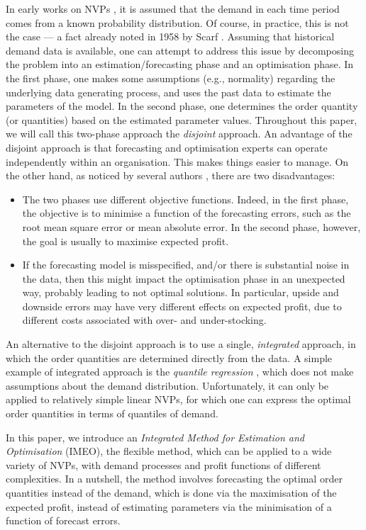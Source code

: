 \documentclass[a4paper,11pt]{article}
\begin{document}
In early works on NVPs \cite{AHM51,MK51}, it is assumed that the demand in each time period comes from a known probability distribution. Of course, in practice, this is not the case --- a fact already noted in 1958 by Scarf \cite{Sc58}. Assuming that historical demand data is available, one can attempt to address this issue by decomposing the problem into an estimation/forecasting phase and an optimisation phase. In the first phase, one makes some assumptions (e.g., normality) regarding the underlying data generating process, and uses the past data to estimate the parameters of the model. In the second phase, one determines the order quantity (or quantities) based on the estimated parameter values. Throughout this paper, we will call this two-phase approach the \emph{disjoint} approach. An advantage of the disjoint approach is that forecasting and optimisation experts can operate independently within an organisation. This makes things easier to manage. On the other hand, as noticed by several authors \cite{BT06,BM12,Ka94,KT96,KTB20}, there are two disadvantages:
\begin{itemize}
    \item The two phases use different objective functions. Indeed, in the first phase, the objective is to minimise a function of the forecasting errors, such as the root mean square error or mean absolute error. In the second phase, however, the goal is usually to maximise expected profit.
    \item If the forecasting model is misspecified, and/or there is substantial noise in the data, then this might impact the optimisation phase in an unexpected way, probably leading to not optimal solutions. In particular, upside and downside errors may have very different effects on expected profit, due to different costs associated with over- and under-stocking.
\end{itemize}

An alternative to the disjoint approach is to use a single, \emph{integrated} approach, in which the order quantities are determined directly from the data. A simple example of integrated approach is the \emph{quantile regression} \cite{Br16,Hu19}, which does not make assumptions about the demand distribution. Unfortunately, it can only be applied to relatively simple linear NVPs, for which one can express the optimal order quantities in terms of quantiles of demand.

In this paper, we introduce an \emph{Integrated Method for Estimation and Optimisation} (IMEO), the flexible method, which can be applied to a wide variety of NVPs, with demand processes and profit functions of different complexities. In a nutshell, the method involves forecasting the optimal order quantities instead of the demand, which is done via the maximisation of the expected profit, instead of estimating parameters via the minimisation of a function of forecast errors.
\end{document}

